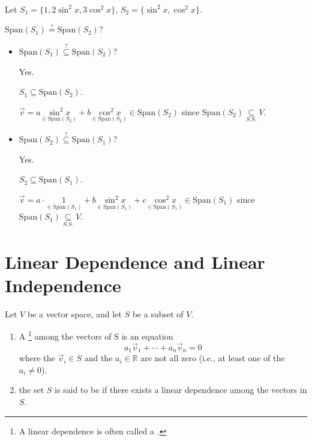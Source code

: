 \documentclass[11pt,fleqn]{book} %
\begin{document}
\begin{example}
{~~~}

    Let $S_1=\{ 1, 2\sin^2{x}, 3\cos^2{x} \}$, $S_2 = \{ \sin^2{x}, \cos^2{x} \}$.

    $\mathrm{Span}(S_1) \overset{?}= \mathrm{Span}(S_2)$?

    \begin{itemize}
        \item $\mathrm{Span}\left( S_1 \right) \overset{?}{\subseteq} \mathrm{Span}\left( S_2 \right)$?

        {\color{lightblue} Yes.

        $S_1 \subseteq \mathrm{Span}\left( S_2 \right)$.

        $\vec{v} = a\underset{\in \mathrm{Span}\left( S_2 \right)}{\sin^2x}+b\underset{\in\mathrm{Span}\left( S_2 \right)}{\cos^2x} \in \mathrm{Span}\left( S_2 \right)$ since $\mathrm{Span}\left( S_2 \right) \underset{S.S.}{\subseteq} V$. }

        \item $\mathrm{Span}\left( S_2 \right) \overset{?}{\subseteq} \mathrm{Span}\left( S_1 \right)$?

        {\color{lightblue} Yes.

        $S_2 \subseteq \mathrm{Span}\left( S_1 \right)$.

        $\vec{v} = a \cdot \underset{\in\mathrm{Span}\left( S_1 \right)}{1} + b \underset{\in \mathrm{Span}\left( S_1 \right)}{\sin^2x} + c \underset{\in\mathrm{Span}\left( S_1 \right)}{\cos^2x} \in \mathrm{Span}\left( S_1 \right)$ since $\mathrm{Span}\left( S_1 \right) \underset{S.S.}{\subseteq} V$. }

    \end{itemize}
\end{example}

\section{Linear Dependence and Linear Independence}

\setcounter{section}{4}
\setcounter{definitionT}{1}
\begin{definition}
    Let $V$ be a vector space, and let $S$ be a subset of $V$.

    \begin{enumerate}[label=\alph*)]
        \item A \footnote{A linear dependence is often called a . } among the vectors of S is an equation $$a_1\vec{v}_1 + \cdots + a_n\vec{v}_n = 0$$ where the $\vec{v}_i \in S$ and the $a_i \in \mathbb{R}$ are not all zero (i.e., at least one of the $a_i \neq 0$).

        \item the set $S$ is said to be  if there exists a linear dependence among the vectors in $S$.
    \end{enumerate}
\end{definition}
\setcounter{section}{5}
\end{document}
